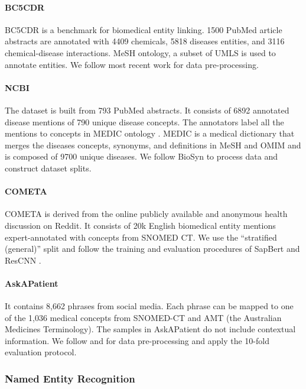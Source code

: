 \documentclass[11pt]{article}
\begin{document}
\paragraph{BC5CDR} \cite{li2016biocreative} BC5CDR is a benchmark for biomedical entity linking. 1500 PubMed article abstracts are annotated with 4409 chemicals, 5818 diseases entities, and 3116 chemical-disease interactions. MeSH ontology, a subset of UMLS is used to annotate entities. We follow most recent work \cite{clustering,dataintegration} for data pre-processing.

\paragraph{NCBI} \cite{dougan2014ncbi} The dataset is built from 793 PubMed abstracts. It consists of 6892 annotated disease mentions of 790 unique disease concepts. The annotators label all the mentions to concepts in MEDIC ontology \cite{davis2012medic}. MEDIC is a medical dictionary that merges the diseases concepts, synonyms, and definitions in MeSH and OMIM and is composed of 9700 unique diseases. We follow BioSyn \cite{sung2020biomedical} to process data and construct dataset splits. 

\paragraph{COMETA} \cite{cometa} COMETA is derived from the online publicly available and anonymous health discussion on Reddit. It consists of 20k English biomedical entity mentions expert-annotated with concepts from SNOMED CT. We use the “stratified (general)” split and follow the training and evaluation procedures of SapBert \cite{sapbert} and ResCNN \cite{rescnn}.

\paragraph{AskAPatient} \cite{limsopatham-collier-2016-normalising} It contains 8,662 phrases from social media. Each phrase can be mapped to one of the 1,036 medical concepts from SNOMED-CT and AMT (the Australian Medicines Terminology). The samples in AskAPatient do not include contextual information. We follow \citet{sung2020biomedical} and \citet{limsopatham-collier-2016-normalising} for data pre-processing and apply the 10-fold evaluation protocol.

\subsubsection{Named Entity Recognition}
\end{document}
